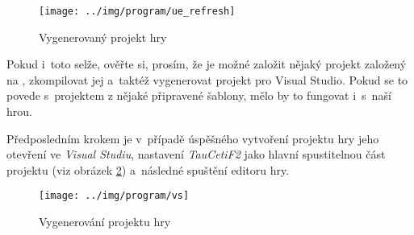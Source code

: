 \begin{figure}[!ht]\centering
\texttt{[image: ../img/program/ue\_refresh]}

\caption{Vygenerovaný projekt hry}
\label{fig:ue_refresh}

\end{figure}

\FloatBarrier



Pokud i~toto selže, ověřte si, prosím, že je možné založit nějaký projekt založený na \CPP{}, zkompilovat jej a~taktéž vygenerovat projekt pro Visual Studio. Pokud se to povede s~projektem z nějaké připravené šablony, mělo by to fungovat i~s~naší hrou.


Předposledním krokem je v~případě úspěšného vytvoření projektu hry jeho otevření ve \textit{Visual Studiu}, nastavení \textit{TauCetiF2} jako hlavní spustitelnou část projektu (viz obrázek \ref{fig:vs}) a~následné spuštění  editoru hry.


\begin{figure}[!ht]\centering
\texttt{[image: ../img/program/vs]}

\caption{Vygenerování projektu hry}
\label{fig:vs}

\end{figure}

\FloatBarrier




